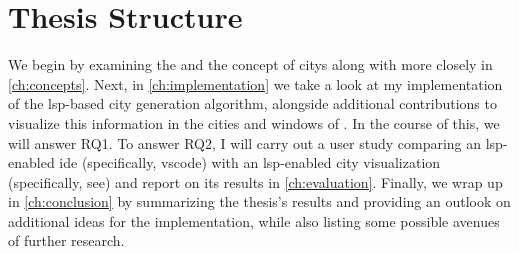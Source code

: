 \documentclass[../thesis]{subfiles}
\begin{document}
\section{Thesis Structure}

We begin by examining the  and the concept of \glspl{city} along with \SEE{} more closely in \cref{ch:concepts}.
Next, in \cref{ch:implementation} we take a look at my implementation of the \gls{lsp}-based \gls{city} generation algorithm, alongside additional contributions to visualize this information in the cities and \glspl{window} of \SEE{}.
In the course of this, we will answer \textsf{RQ1}.
To answer \textsf{RQ2}, I will carry out a user study comparing an \gls{lsp}-enabled \gls{ide} (specifically, \gls{vscode}) with an \gls{lsp}-enabled \gls{city} visualization (specifically, \gls{see}) and report on its results in \cref{ch:evaluation}.
Finally, we wrap up in \cref{ch:conclusion} by summarizing the thesis's results and providing an outlook on additional ideas for the implementation, while also listing some possible avenues of further research.
\end{document}
